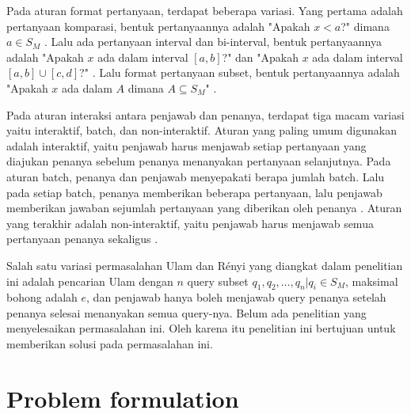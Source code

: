 \documentclass[conference,compsoc]{IEEEtran}
\begin{document}
Pada aturan format pertanyaan, terdapat beberapa variasi. Yang pertama adalah pertanyaan komparasi, bentuk pertanyaannya adalah "Apakah $x<a$?" dimana $a \in S_M$ \cite{Innes} \cite{Auletta1992}. Lalu ada pertanyaan interval dan bi-interval, bentuk pertanyaannya adalah "Apakah $x$ ada dalam interval $[a,b]$?" \cite{Peter2017} dan "Apakah $x$ ada dalam interval $[a,b] \cup [c,d]$?" \cite{Mundici1997}. Lalu format pertanyaan subset, bentuk pertanyaannya adalah "Apakah $x$ ada dalam $A$ dimana $A \subseteq S_M$" \cite{Katona} \cite{Macula1997}.

Pada aturan interaksi antara penjawab dan penanya, terdapat tiga macam variasi yaitu interaktif, batch, dan non-interaktif. Aturan yang paling umum digunakan adalah interaktif, yaitu penjawab harus menjawab setiap pertanyaan yang diajukan penanya sebelum penanya menanyakan pertanyaan selanjutnya. Pada aturan batch, penanya dan penjawab menyepakati berapa jumlah batch. Lalu pada setiap batch, penanya memberikan beberapa pertanyaan, lalu penjawab memberikan jawaban sejumlah pertanyaan yang diberikan oleh penanya \cite{Cicalese2000}. Aturan yang terakhir adalah non-interaktif, yaitu penjawab harus menjawab semua pertanyaan penanya sekaligus \cite{Macula1997}.


Salah satu variasi permasalahan Ulam dan Rényi yang diangkat dalam penelitian ini adalah pencarian Ulam dengan $n$ query subset ${q_1,q_2,\ldots,q_n} | q_i \in S_M$, maksimal bohong adalah $e$, dan penjawab hanya boleh menjawab query penanya setelah penanya selesai menanyakan semua query-nya. Belum ada penelitian yang menyelesaikan permasalahan ini. Oleh karena itu penelitian ini bertujuan untuk memberikan solusi pada permasalahan ini.

\section{Problem formulation}
\end{document}
